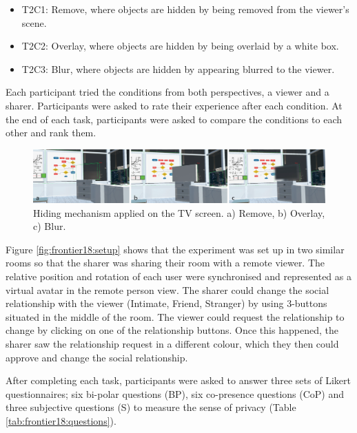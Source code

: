 \begin{itemize}
\item T2C1: Remove, where objects are hidden by being removed from the viewer's scene.
\item T2C2: Overlay, where objects are hidden by being overlaid by a white box. 
\item T2C3: Blur, where objects are hidden by appearing blurred to the viewer. 
\end{itemize}

Each participant tried the conditions from both perspectives, a viewer and a sharer. Participants were asked to rate their experience after each condition. At the end of each task, participants were asked to compare the conditions to each other and rank them. 

\begin{figure}
\begin{center}
\includegraphics[width=\linewidth]{images/frontier18/images-01.png}
\caption{Hiding mechanism applied on the TV screen. a) Remove, b) Overlay, c) Blur.}\label{fig:frontier18:hiding-mechanism}
\end{center}
\end{figure}

Figure \ref{fig:frontier18:setup} shows that the experiment was set up in two similar rooms so that the sharer was sharing their room with a remote viewer. The relative position and rotation of each user were synchronised and represented as a virtual avatar in the remote person view. The sharer could change the social relationship with the viewer (Intimate, Friend, Stranger) by using 3-buttons situated in the middle of the room. The viewer could request the relationship to change by clicking on one of the relationship buttons. Once this happened, the sharer saw the relationship request in a different colour, which they then could approve and change the social relationship.

After completing each task, participants were asked to answer three sets of Likert questionnaires; six bi-polar questions (BP), six co-presence questions (CoP) and three subjective questions (S) to measure the sense of privacy (Table \ref{tab:frontier18:questions}).  

